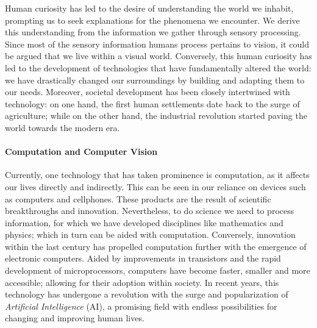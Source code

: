 Human curiosity has led to the desire of understanding the world we inhabit, prompting us to seek
explanations for the phenomena we encounter. We derive this understanding from the information 
we gather through sensory processing. Since most of the sensory information humans process pertains 
to vision, it could be argued that we live within a visual world. Conversely, this human curiosity 
has led to the development of technologies that have fundamentally altered the world: we have 
drastically changed our surroundings by building and adapting them to our needs. Moreover, societal 
development has been closely intertwined with technology: on one hand, the first human settlements 
date back to the surge of agriculture; while on the other hand, the industrial revolution started 
paving the world towards the modern era.\\

\paragraph{Computation and Computer Vision} Currently, one technology that has taken prominence is 
computation, as it affects our lives directly and indirectly. This can be seen in our reliance on 
devices such as computers and  cellphones. These products are the result of scientific breakthroughs 
and innovation. Nevertheless, to do science we need to process information, for which we have 
developed disciplines like mathematics and physics; which in turn can be aided with computation. 
Conversely, innovation within the last century has propelled computation further with the emergence 
of electronic computers. Aided by improvements in transistors and the rapid development of 
microprocessors, computers have become faster, smaller and more accessible; allowing for their 
adoption within society. In recent years, this technology has undergone a revolution with the surge 
and popularization of \emph{Artificial Intelligence} (AI), a promising field with endless 
possibilities for changing and improving human lives.\\


